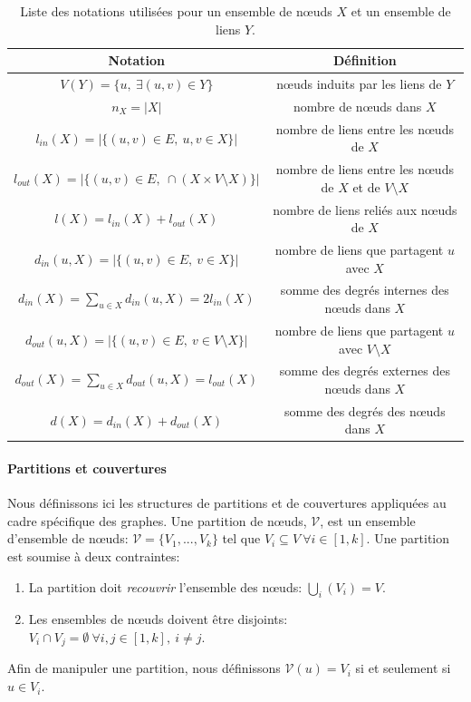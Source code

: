 \begin{table}
  \centering
    \begin{tabular}{|c|c|}
     \hline
    \rule[-1ex]{0pt}{4ex} Notation & Définition \\
  \hline
		\hline
		\rule[-1ex]{0pt}{4ex}$V(Y)=\{u,\ \exists (u,v) \in Y \}$ & n\oe uds induits par les liens de $Y$\\
		\hline
        \rule[-1ex]{0pt}{4ex}$n_X=|X|$ & nombre de n\oe uds dans $X$\\
        \hline
        \rule[-1ex]{0pt}{4ex} $l_{in}(X)=|\{(u,v) \in E,\ u,v \in X\}|$ & nombre de liens entre les n\oe uds de $X$\\
        \hline
        \rule[-1ex]{0pt}{4ex} $l_{out}(X)=|\{(u,v) \in E,\ \cap (X \times V \setminus X)\}|$ & nombre de liens entre les n\oe uds de $X$ et de $V \setminus X$ \\
        \hline
        \rule[-1ex]{0pt}{4ex} $l(X)=l_{in}(X)+l_{out}(X)$ & nombre de liens reliés aux n\oe uds de $X$\\
        \hline
        \rule[-1ex]{0pt}{4ex} $d_{in}(u,X)=|\{(u,v) \in E,\ v \in X\}|$ & nombre de liens que partagent $u$ avec $X$ \\
        \hline
        \rule[-1ex]{0pt}{4ex} $d_{in}(X)=\sum_{u \in X} d_{in}(u,X)=2l_{in}(X)$ & somme des degrés internes des n\oe uds dans $X$ \\
        \hline
        \rule[-1ex]{0pt}{4ex} $d_{out}(u,X)=|\{(u,v) \in E,\ v \in V \setminus X\}|$ & nombre de liens que partagent $u$ avec $V \setminus X$ \\
        \hline
        $d_{out}(X)=\sum_{u \in X} d_{out}(u,X)=l_{out}(X)$ & somme des degrés externes des n\oe uds dans $X$ \\
        \hline
        $d(X)=d_{in}(X)+ d_{out}(X)$ & somme des degrés des n\oe uds dans $X$ \\
        \hline
    \end{tabular}
    \caption{Liste des notations utilisées pour un ensemble de n\oe uds $X$ et un ensemble de liens $Y$.}
         \label{tab:notation_groupe_noeuds}
\end{table}%


\paragraph{Partitions et couvertures}
Nous définissons ici les structures de partitions et de couvertures appliquées au cadre spécifique des graphes.
Une partition de n\oe uds, $\mathcal{V}$, est un ensemble d'ensemble de n\oe uds: $\mathcal{V}= \{V_1,..., V_k\}$ tel que $V_i \subseteq V\ \forall i \in [1,k]$.
Une partition est soumise à deux contraintes:
\begin{enumerate}
\item La partition doit \emph{recouvrir} l'ensemble des n\oe uds: $\bigcup_{i}( V_i) = V$.
\item Les ensembles de n\oe uds doivent être disjoints: $V_i \cap V_j = \emptyset\ \forall i,j \in [1,k],\ i \neq j$.
\end{enumerate}
Afin de manipuler une partition, nous définissons $\mathcal{V}(u)=V_i$ si et seulement si $u \in V_i$.
\bigskip

